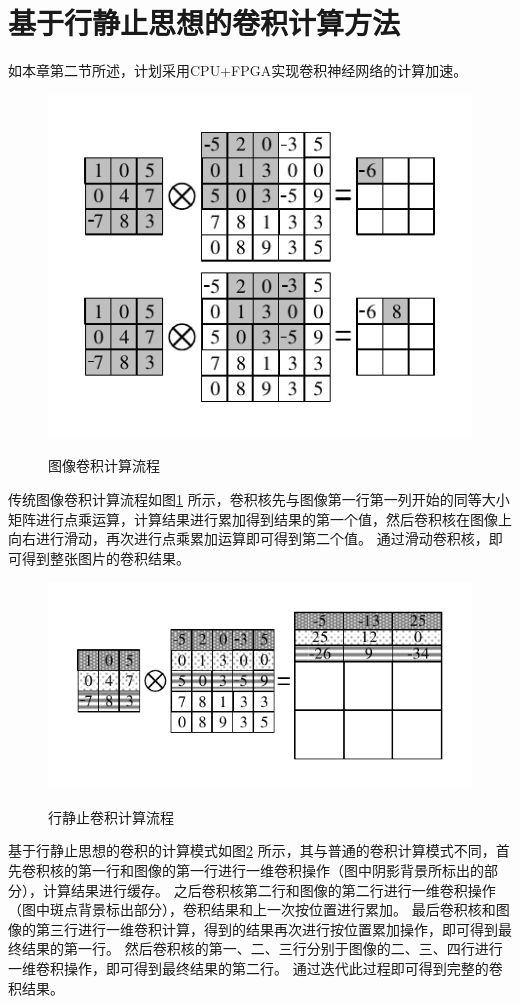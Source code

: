 \section{基于行静止思想的卷积计算方法}
如本章第二节所述，计划采用CPU+FPGA实现卷积神经网络的计算加速。
\begin{figure}[h]
    \centering
    \includegraphics{../pdf/tra_conv.pdf}\\
    \caption{图像卷积计算流程}
    \label{tra_conv}
\end{figure}
传统图像卷积计算流程如图\ref{tra_conv} 所示，卷积核先与图像第一行第一列开始的同等大小矩阵进行点乘运算，计算结果进行累加得到结果的第一个值，然后卷积核在图像上向右进行滑动，再次进行点乘累加运算即可得到第二个值。
通过滑动卷积核，即可得到整张图片的卷积结果。
\begin{figure}[h]
    \centering
    \includegraphics{../pdf/row_conv.pdf}\\
    \caption{行静止卷积计算流程}
    \label{row_conv}
\end{figure}
基于行静止思想的卷积的计算模式如图\ref{row_conv} 所示，其与普通的卷积计算模式不同，首先卷积核的第一行和图像的第一行进行一维卷积操作（图中阴影背景所标出的部分），计算结果进行缓存。
之后卷积核第二行和图像的第二行进行一维卷积操作（图中斑点背景标出部分），卷积结果和上一次按位置进行累加。
最后卷积核和图像的第三行进行一维卷积计算，得到的结果再次进行按位置累加操作，即可得到最终结果的第一行。
然后卷积核的第一、二、三行分别于图像的二、三、四行进行一维卷积操作，即可得到最终结果的第二行。
通过迭代此过程即可得到完整的卷积结果。

